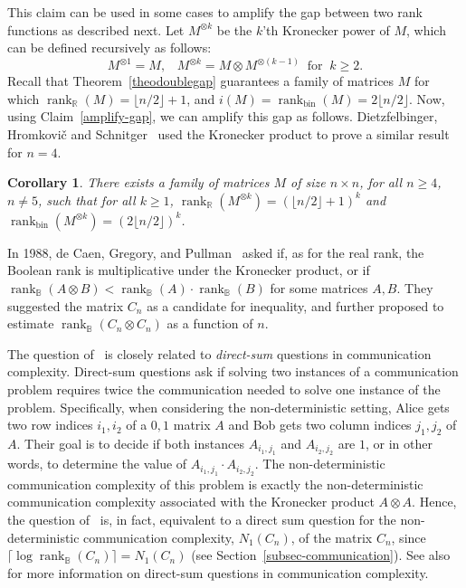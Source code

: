 \documentclass[11pt]{article}
\newtheorem{corollary}[theorem]{Corollary}
\newcommand{\rank}{\mathop{\mathrm{rank}}}
\newcommand{\Rbool}{{\rank}_\mathbb{B}}
\newcommand{\Rbin}{{\rank}_{\mathrm{bin}}}
\newcommand{\Rreal}{{\rank}_\mathbb{R}}
\begin{document}
{{This claim can be used in some cases to amplify the gap between two rank functions as described next.
Let $M^{\otimes k}$ be the $k$'th Kronecker power of $M$, which can be defined recursively as follows:
$$M^{\otimes 1} = M, \;\;\; M^{\otimes k} = M \otimes M^{\otimes (k-1)} \;\; \textrm{for} \;\; k \geq 2.$$
Recall that Theorem~\ref{theodoublegap} guarantees a family of matrices $M$ for which $\Rreal(M) =  \lfloor n/2\rfloor + 1$, and $i(M) = \Rbin(M) = 2\lfloor n/2\rfloor$.
Now, using Claim~\ref{amplify-gap}, we can amplify this gap as follows.
Dietzfelbinger,  Hromkovi{\v{c}} and Schnitger~\cite{dietzfelbinger1996comparison} used the Kronecker product to prove a similar result for  $n = 4$.

\begin{corollary}
There exists a family of matrices $M$ of size $n \times n$, for all $n \geq 4$, $n \neq 5$, such that for all $k \geq 1$,
$\Rreal(M^{\otimes k}) = (\lfloor n/2\rfloor + 1)^k$ and $\Rbin(M^{\otimes k}) = (2\lfloor n/2\rfloor)^{k}$.
\end{corollary}

In 1988,  de Caen, Gregory, and Pullman~\cite{de1988boolean} asked if, as for the real rank, the Boolean rank is multiplicative under the Kronecker product,
or if $\Rbool(A \otimes B) < \Rbool(A)\cdot \Rbool(B)$ for some matrices $A,B$.
They suggested the matrix $C_n$ as a candidate for inequality, and further proposed to estimate $\Rbool(C_n \otimes C_n)$ as a function of $n$.

The question of~\cite{de1988boolean} is closely related to {\em direct-sum} questions in communication complexity.
Direct-sum questions ask if solving two instances of a communication problem requires twice the communication needed to solve one instance of the problem.
Specifically, when considering the non-deterministic setting, Alice gets two row indices $i_1,i_2$ of a $0,1$ matrix $A$ and Bob gets two column indices $j_1,j_2$ of $A$.
Their goal is to decide if both instances $A_{i_1,j_1}$ and $A_{i_2,j_2}$ are $1$, or in other words, to determine the value of $A_{i_1,j_1} \cdot A_{i_2,j_2}$.
The non-deterministic communication complexity of this problem is exactly the non-deterministic communication complexity associated with the Kronecker product $A \otimes A$.
Hence, the question of~\cite{de1988boolean} is, in fact, equivalent to a direct sum question for the non-deterministic communication complexity, $N_1(C_n)$, of the matrix $C_n$,
since $\lceil\log \Rbool(C_n)\rceil = N_1(C_n)$ (see Section~\ref{subsec-communication}).
See also~\cite{FederKNN95,karchmer1995fractional,KN97} for more information on direct-sum questions in communication complexity.

}}
\end{document}
